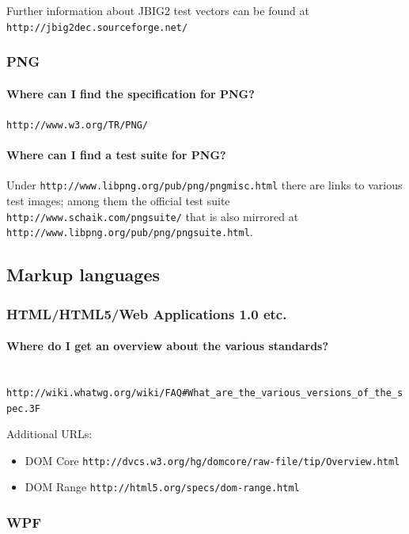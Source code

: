 \documentclass[10pt]{scrbook}
\begin{document}
Further information about JBIG2 test vectors can be found at \verb|http://jbig2dec.sourceforge.net/|

\subsubsection{PNG}

\paragraph{Where can I find the specification for PNG?} \verb|http://www.w3.org/TR/PNG/|

\paragraph{Where can I find a test suite for PNG?}

Under \verb|http://www.libpng.org/pub/png/pngmisc.html| there are links to various test images; among them the official test suite \verb|http://www.schaik.com/pngsuite/| that is also mirrored at \verb|http://www.libpng.org/pub/png/pngsuite.html|.

\subsection{Markup languages}

\subsubsection{HTML/HTML5/Web Applications 1.0 etc.}

\paragraph{Where do I get an overview about the various standards?} ~ \\
\verb|http://wiki.whatwg.org/wiki/FAQ#What_are_the_various_versions_of_the_spec.3F|

Additional URLs:
\begin{itemize}
\item DOM Core \verb|http://dvcs.w3.org/hg/domcore/raw-file/tip/Overview.html|
\item DOM Range \verb|http://html5.org/specs/dom-range.html|
\end{itemize}

\subsubsection{WPF}
\end{document}
